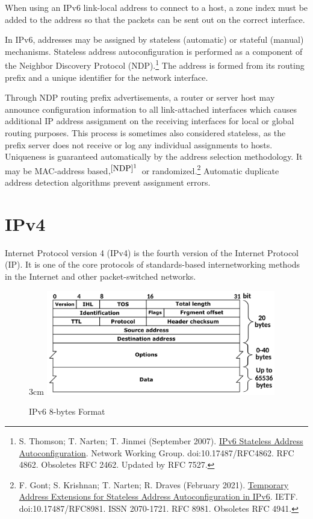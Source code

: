 \documentclass[a4paper,12pt]{article}
\begin{document}
When using an IPv6 link-local address to connect to a host, a zone index must be added to the address so that the packets can be sent out on the correct interface.

In IPv6, addresses may be assigned by stateless (automatic) or stateful (manual) mechanisms. Stateless address autoconfiguration is performed as a component of the Neighbor Discovery Protocol (NDP).\footnote{\label{NDP} S. Thomson; T. Narten; T. Jinmei (September 2007). \href{https://datatracker.ietf.org/doc/html/rfc4862}{IPv6 Stateless Address Autoconfiguration}. Network Working Group. doi:10.17487/RFC4862. RFC 4862. Obsoletes RFC 2462. Updated by RFC 7527.} The address is formed from its routing prefix and a unique identifier for the network interface.

Through NDP routing prefix advertisements, a router or server host may announce configuration information to all link-attached interfaces which causes additional IP address assignment on the receiving interfaces for local or global routing purposes. This process is sometimes also considered stateless, as the prefix server does not receive or log any individual assignments to hosts. Uniqueness is guaranteed automatically by the address selection methodology. It may be MAC-address based$,^{\footnotemark[1 \ref{NDP}]}$  or randomized.\footnote{\label{randomized} F. Gont; S. Krishnan; T. Narten; R. Draves (February 2021). \href{https://datatracker.ietf.org/doc/html/rfc8981}{Temporary Address Extensions for Stateless Address Autoconfiguration in IPv6}. IETF. doi:10.17487/RFC8981. ISSN 2070-1721. RFC 8981. Obsoletes RFC 4941.} Automatic duplicate address detection algorithms prevent assignment errors.



\section{IPv4}

Internet Protocol version 4 (IPv4) is the fourth version of the Internet Protocol (IP). It is one of the core protocols of standards-based internetworking methods in the Internet and other packet-switched networks.

\begin{figure}{3cm}
\centering
\includegraphics[width=10cm]{./IPv4_Packet-en.svg.PNG}
\caption{IPv6 8-bytes Format }\label{wrap-fig:9}
\end{figure}
\end{document}
